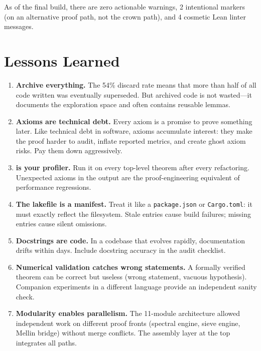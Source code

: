 \documentclass[11pt,a4paper]{article}
\begin{document}
As of the final build, there are zero actionable warnings, 2
intentional  markers (on an alternative proof path,
not the crown path), and 4 cosmetic Lean linter messages.

\section{Lessons Learned}
\label{sec:lessons}

\begin{enumerate}
  \item \textbf{Archive everything.} The 54\% discard rate means that
    more than half of all code written was eventually superseded. But
    archived code is not wasted---it documents the exploration space
    and often contains reusable lemmas.

  \item \textbf{Axioms are technical debt.} Every axiom is a promise
    to prove something later. Like technical debt in software, axioms
    accumulate interest: they make the proof harder to audit, inflate
    reported metrics, and create ghost axiom risks. Pay them down
    aggressively.

  \item \textbf{ is your profiler.} Run it on
    every top-level theorem after every refactoring. Unexpected
    axioms in the output are the proof-engineering equivalent of
    performance regressions.

  \item \textbf{The lakefile is a manifest.} Treat it like a
    \texttt{package.json} or \texttt{Cargo.toml}: it must exactly
    reflect the filesystem. Stale entries cause build failures;
    missing entries cause silent omissions.

  \item \textbf{Docstrings are code.} In a codebase that evolves
    rapidly, documentation drifts within days. Include docstring
    accuracy in the audit checklist.

  \item \textbf{Numerical validation catches wrong statements.}
    A formally verified theorem can be correct but useless (wrong
    statement, vacuous hypothesis). Companion experiments in a
    different language provide an independent sanity check.

  \item \textbf{Modularity enables parallelism.} The 11-module
    architecture allowed independent work on different proof fronts
    (spectral engine, sieve engine, Mellin bridge) without merge
    conflicts. The assembly layer at the top integrates all paths.


\end{enumerate}
\end{document}
